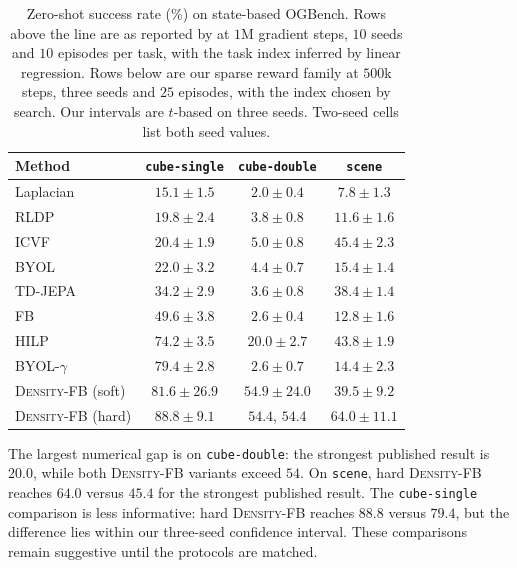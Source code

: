 \documentclass{article}
\newcommand{\DensityFB}{\textsc{Density-FB}}
\begin{document}
\begin{table}[h]
\centering
\small
\begin{tabular}{lccc}
\toprule
Method
& \texttt{cube-single}
& \texttt{cube-double}
& \texttt{scene} \\
\midrule

Laplacian \citep{wu2018laplacian}
& $15.1 \pm 1.5$
& $2.0 \pm 0.4$
& $7.8 \pm 1.3$ \\

RLDP \citep{jajoo-iclr26a}
& $19.8 \pm 2.4$
& $3.8 \pm 0.8$
& $11.6 \pm 1.6$ \\

ICVF \citep{ghosh2023reinforcement}
& $20.4 \pm 1.9$
& $5.0 \pm 0.8$
& $45.4 \pm 2.3$ \\

BYOL
& $22.0 \pm 3.2$
& $4.4 \pm 0.7$
& $15.4 \pm 1.4$ \\

TD-JEPA \citep{bagatella-iclr26a}
& $34.2 \pm 2.9$
& $3.6 \pm 0.8$
& $38.4 \pm 1.4$ \\

FB \citep{touati2021learning}
& $49.6 \pm 3.8$
& $2.6 \pm 0.4$
& $12.8 \pm 1.6$ \\

HILP \citep{park-iclr24a}
& $74.2 \pm 3.5$
& $20.0 \pm 2.7$
& $43.8 \pm 1.9$ \\

BYOL-$\gamma$
& $79.4 \pm 2.8$
& $2.6 \pm 0.7$
& $14.4 \pm 2.3$ \\
\midrule

\DensityFB{} (soft)
& $81.6 \pm 26.9$
& $\mathbf{54.9 \pm 24.0}$
& $39.5 \pm 9.2$ \\

\DensityFB{} (hard)
& $\mathbf{88.8 \pm 9.1}$
& $54.4$, $54.4$
& $\mathbf{64.0 \pm 11.1}$ \\
\bottomrule
\end{tabular}

\caption{
Zero-shot success rate (\%) on state-based OGBench.
Rows above the line are as reported by \citet{bagatella-iclr26a} at $1$M gradient steps, $10$ seeds and $10$ episodes per task, with the task index inferred by linear regression.
Rows below are our sparse reward family at $500$k steps, three seeds and $25$ episodes, with the index chosen by search.
Our intervals are $t$-based on three seeds.
Two-seed cells list both seed values.
}
\label{tab:published}
\end{table}

The largest numerical gap is on \texttt{cube-double}: the strongest published result is $20.0$, while both \DensityFB{} variants exceed $54$.
On \texttt{scene}, hard \DensityFB{} reaches $64.0$ versus $45.4$ for the strongest published result.
The \texttt{cube-single} comparison is less informative: hard \DensityFB{} reaches $88.8$ versus $79.4$, but the difference lies within our three-seed confidence interval.
These comparisons remain suggestive until the protocols are matched.
\end{document}
